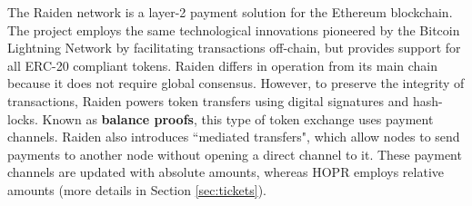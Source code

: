The Raiden network \cite{raiden} is a layer-2 payment solution for the Ethereum blockchain. The project employs the same technological innovations pioneered by the Bitcoin Lightning Network by facilitating transactions off-chain, but provides support for all ERC-20 compliant tokens. Raiden differs in operation from its main chain because it does not require global consensus. However, to preserve the integrity of transactions, Raiden powers token transfers using digital signatures and hash-locks. Known as \textbf{balance proofs}, this type of token exchange uses payment channels. Raiden also introduces ``mediated transfers", which allow nodes to send payments to another node without opening a direct channel to it. These payment channels are updated with absolute amounts, whereas HOPR employs relative amounts (more details in Section \ref{sec:tickets}).

